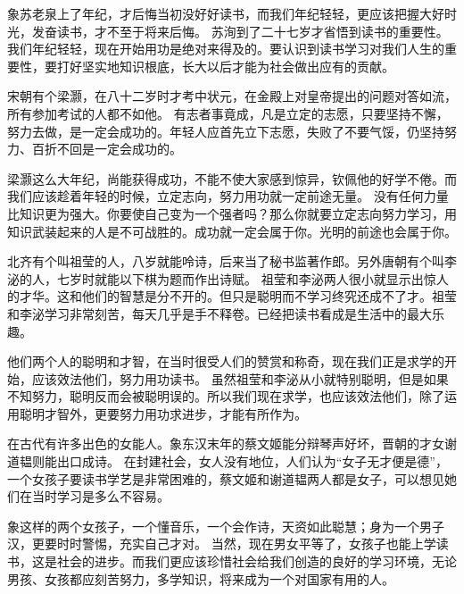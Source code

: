 \documentclass[avery5371,grid]{flashcards}
\begin{document}
{象苏老泉上了年纪，才后悔当初没好好读书，而我们年纪轻轻，更应该把握大好时光，发奋读书，才不至于将来后悔。} %
{苏洵到了二十七岁才省悟到读书的重要性。我们年纪轻轻，现在开始用功是绝对来得及的。要认识到读书学习对我们人生的重要性，要打好坚实地知识根底，长大以后才能为社会做出应有的贡献。} %

{宋朝有个梁灏，在八十二岁时才考中状元，在金殿上对皇帝提出的问题对答如流，所有参加考试的人都不如他。} %
{有志者事竟成，凡是立定的志愿，只要坚持不懈，努力去做，是一定会成功的。年轻人应首先立下志愿，失败了不要气馁，仍坚持努力、百折不回是一定会成功的。} %

{梁灏这么大年纪，尚能获得成功，不能不使大家感到惊异，钦佩他的好学不倦。而我们应该趁着年轻的时候，立定志向，努力用功就一定前途无量。} %
{没有任何力量比知识更为强大。你要使自己变为一个强者吗？那么你就要立定志向努力学习，用知识武装起来的人是不可战胜的。成功就一定会属于你。光明的前途也会属于你。} %

{北齐有个叫祖莹的人，八岁就能呤诗，后来当了秘书监著作郎。另外唐朝有个叫李泌的人，七岁时就能以下棋为题而作出诗赋。} %
{祖莹和李泌两人很小就显示出惊人的才华。这和他们的智慧是分不开的。但只是聪明而不学习终究还成不了才。祖莹和李泌学习非常刻苦，每天几乎是手不释卷。已经把读书看成是生活中的最大乐趣。} %

{他们两个人的聪明和才智，在当时很受人们的赞赏和称奇，现在我们正是求学的开始，应该效法他们，努力用功读书。} %
{虽然祖莹和李泌从小就特别聪明，但是如果不知努力，聪明反而会被聪明误的。所以我们现在求学，也应该效法他们，除了运用聪明才智外，更要努力用功求进步，才能有所作为。} %

{在古代有许多出色的女能人。象东汉末年的蔡文姬能分辩琴声好坏，晋朝的才女谢道韫则能出口成诗。} %
{在封建社会，女人没有地位，人们认为“女子无才便是德”，一个女孩子要读书学艺是非常困难的，蔡文姬和谢道韫两人都是女子，可以想见她们在当时学习是多么不容易。} %

{象这样的两个女孩子，一个懂音乐，一个会作诗，天资如此聪慧；身为一个男子汉，更要时时警惕，充实自己才对。} %
{当然，现在男女平等了，女孩子也能上学读书，这是社会的进步。而我们更应该珍惜社会给我们创造的良好的学习环境，无论男孩、女孩都应刻苦努力，多学知识，将来成为一个对国家有用的人。} %
\end{document}
